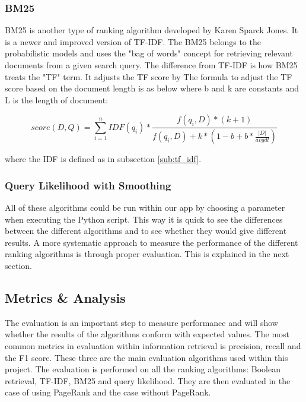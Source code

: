 
\subsubsection{BM25} %
\label{ssub:BM25}

BM25 is another type of ranking algorithm developed by Karen Sparck Jones. It is a newer and improved version of TF-IDF. The BM25 belongs to the probabilistic models and uses the "bag of words" concept for retrieving relevant documents from a given search query. The difference from TF-IDF is how BM25 treats the "TF" term. It adjusts the TF score by The formula to adjust the TF score based on the document length is as below where b and k are constants and L is the length of document:

$$ score(D, Q) = \sum_{i=1}^n IDF(q_i) * \frac{f(q_i, D)* (k + 1)}{f(q_i, D) + k * (1-b + b * \frac{|D|}{avgdl})}$$

where the IDF is defined as in subsection \ref{sub:tf_idf}.


\subsubsection{Query Likelihood with Smoothing} %
\label{ssub:query_likelihood_with_smoothing}


All of these algorithms could be run within our app by choosing a parameter when executing the Python script. This way it is quick to see the differences between the different algorithms and to see whether they would give different results. A more systematic approach to measure the performance of the different ranking algorithms is through proper evaluation. This is explained in the next section.



\subsection{Metrics \& Analysis} %
\label{sub:metrics_&_analysis}

The evaluation is an important step to measure performance and will show whether the results of the algorithms conform with expected values. The most common metrics in evaluation within information retrieval is precision, recall and the F1 score. These three are the main evaluation algorithms used within this project. The evaluation is performed on all the ranking algorithms: Boolean retrieval, TF-IDF, BM25 and query likelihood. They are then evaluated in the case of using PageRank and the case without PageRank.

